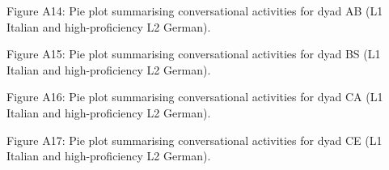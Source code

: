 \begin{stylecaption}
Figure A14: Pie plot summarising conversational activities for dyad AB (L1 Italian and high-proficiency L2 German).
\end{stylecaption}

\begin{stylecaption}
  
 
\end{stylecaption}

\begin{stylecaption}
Figure A15: Pie plot summarising conversational activities for dyad BS (L1 Italian and high-proficiency L2 German).
\end{stylecaption}

\begin{stylecaption}
  
 
\end{stylecaption}

\begin{stylecaption}
Figure A16: Pie plot summarising conversational activities for dyad CA (L1 Italian and high-proficiency L2 German).
\end{stylecaption}

\begin{stylecaption}
  
 
\end{stylecaption}

\begin{stylecaption}
Figure A17: Pie plot summarising conversational activities for dyad CE (L1 Italian and high-proficiency L2 German).
\end{stylecaption}

\begin{stylecaption}
  
 
\end{stylecaption}

